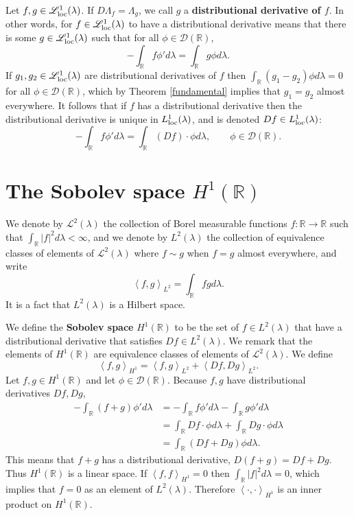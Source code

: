 \documentclass{article}
\newcommand{\inner}[2]{\left\langle #1, #2 \right\rangle}
\newcommand{\Lsemiloc}{\mathscr{L}_{\ensuremath\mathrm{loc}}^1(\lambda)}
\newcommand{\Lloc}{L_{\ensuremath\mathrm{loc}}^1(\lambda)}
\theoremstyle{definition}
\begin{document}
Let $f,g \in \Lsemiloc$. If $D \Lambda_f = \Lambda_g$, we call
$g$ a \textbf{distributional derivative of $f$}. In other words,  for $f \in \Lsemiloc$ to have a distributional derivative
means that there is some  $g \in \Lsemiloc$ such that for all
$\phi \in \mathscr{D}(\mathbb{R})$,
\[
- \int_\mathbb{R} f \phi' d\lambda = \int_\mathbb{R} g \phi d\lambda.
\]
If $g_1,g_2 \in \Lsemiloc$ are distributional derivatives of $f$ then $\int_\mathbb{R} (g_1-g_2) \phi d\lambda=0$ for all
$\phi \in \mathscr{D}(\mathbb{R})$, which by Theorem \ref{fundamental} implies that $g_1=g_2$ almost everywhere. 
It follows that
if $f$ has a distributional derivative then the distributional derivative is unique in $\Lloc$, and is denoted
$Df \in \Lloc$:
\[
-\int_\mathbb{R} f \phi' d\lambda = \int_\mathbb{R} (Df) \cdot \phi d\lambda,\qquad 
\phi \in \mathscr{D}(\mathbb{R}).
\]


\section{The Sobolev space $H^1(\mathbb{R})$}
We denote by $\mathscr{L}^2(\lambda)$ the collection of Borel measurable functions
$f:\mathbb{R} \to \mathbb{R}$ such that $\int_\mathbb{R} |f|^2 d\lambda < \infty$, and
we denote by $L^2(\lambda)$ the collection of equivalence classes of elements of $\mathscr{L}^2(\lambda)$
where $f \sim g$ when $f=g$ almost everywhere, and write
\[
\inner{f}{g}_{L^2} = \int_\mathbb{R} f g d\lambda.
\]
It is a fact that $L^2(\lambda)$ is a Hilbert space. 

 We define the \textbf{Sobolev space} $H^1(\mathbb{R})$ to be 
the set of $f \in L^2(\lambda)$ that have a distributional derivative that satisfies $Df \in L^2(\lambda)$. We remark
that the elements of $H^1(\mathbb{R})$ are equivalence classes of elements of $\mathscr{L}^2(\lambda)$. 
We define 
\[
\inner{f}{g}_{H^1} = \inner{f}{g}_{L^2}+\inner{Df}{Dg}_{L^2}.
\]
Let $f,g \in H^1(\mathbb{R})$ and let $\phi \in \mathscr{D}(\mathbb{R})$. 
Because
$f,g$ have distributional derivatives $Df,Dg$,
\begin{align*}
-\int_\mathbb{R} (f+g)\phi' d\lambda
&=-\int_\mathbb{R} f \phi' d\lambda
-\int_\mathbb{R} g \phi' d\lambda\\
&=\int_\mathbb{R} Df \cdot \phi d\lambda
+\int_\mathbb{R} Dg \cdot \phi d\lambda\\
&=\int_\mathbb{R} (Df+Dg)\phi d\lambda.
\end{align*}
This means that $f+g$ has a distributional derivative,
$D(f+g) = Df+Dg$. 
Thus $H^1(\mathbb{R})$ is a linear space. If 
$\inner{f}{f}_{H^1}=0$ then $\int_\mathbb{R} |f|^2 d\lambda=0$, which implies that $f=0$ as an element of $L^2(\lambda)$.
Therefore $\inner{\cdot}{\cdot}_{H^1}$ is an inner product on $H^1(\mathbb{R})$. 
\end{document}

